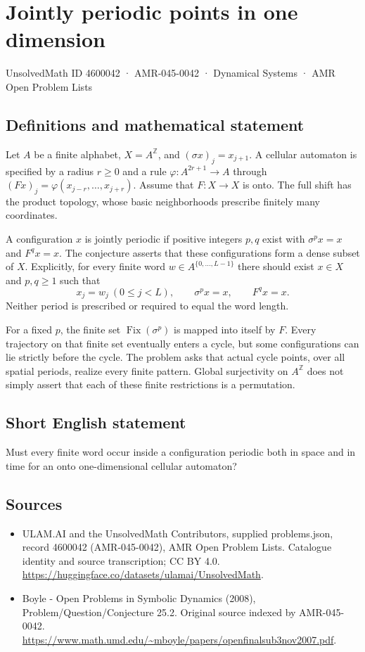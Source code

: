 \documentclass[11pt,a4paper]{article}
\begin{document}
\section*{Jointly periodic points in one dimension}\label{4600042}
{\small UnsolvedMath ID 4600042 · AMR-045-0042 · Dynamical Systems · AMR Open Problem Lists}
\subsection{Definitions and mathematical statement}
Let $A$ be a finite alphabet, $X=A^{\mathbb Z}$, and
$(\sigma x)_j=x_{j+1}$. A cellular automaton is specified by a
radius $r\ge0$ and a rule $\varphi:A^{2r+1}\to A$ through
$(Fx)_j=\varphi(x_{j-r},\ldots,x_{j+r})$. Assume that
$F:X\to X$ is onto. The full shift has the product topology,
whose basic neighborhoods prescribe finitely many coordinates.

A configuration $x$ is jointly periodic if positive integers
$p,q$ exist with $\sigma^p x=x$ and $F^q x=x$.
The conjecture asserts that these configurations form a dense
subset of $X$. Explicitly, for every finite word
$w\in A^{\{0,\ldots,L-1\}}$ there should exist $x\in X$ and
$p,q\ge1$ such that
\[
        x_j=w_j\ (0\le j<L),\qquad
        \sigma^p x=x,\qquad F^q x=x.
\]
Neither period is prescribed or required to equal the word length.

For a fixed $p$, the finite set $\operatorname{Fix}(\sigma^p)$
is mapped into itself by $F$. Every trajectory on that finite
set eventually enters a cycle, but some configurations can lie
strictly before the cycle. The problem asks that actual cycle
points, over all spatial periods, realize every finite pattern.
Global surjectivity on $A^{\mathbb Z}$ does not simply assert
that each of these finite restrictions is a permutation.
\subsection{Short English statement}
Must every finite word occur inside a configuration periodic both in space and in time for an onto one-dimensional cellular automaton?
\subsection{Sources}
\begin{itemize}
\item[S1] ULAM.AI and the UnsolvedMath Contributors, supplied problems.json, record 4600042 (AMR-045-0042), AMR Open Problem Lists. Catalogue identity and source transcription; CC BY 4.0.
\url{https://huggingface.co/datasets/ulamai/UnsolvedMath}.
\item[S2] Boyle - Open Problems in Symbolic Dynamics (2008), Problem/Question/Conjecture 25.2. Original source indexed by AMR-045-0042.
\url{https://www.math.umd.edu/~mboyle/papers/openfinalsub3nov2007.pdf}.
\end{itemize}
\end{document}
